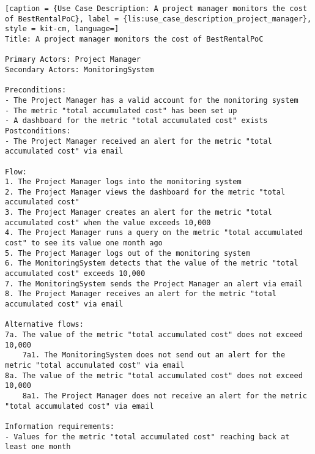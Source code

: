 \vspace{0.5cm}
\begin{lstlisting}[caption = {Use Case Description: A project manager monitors the cost of BestRentalPoC}, label = {lis:use_case_description_project_manager}, style = kit-cm, language=] 
Title: A project manager monitors the cost of BestRentalPoC

Primary Actors: Project Manager
Secondary Actors: MonitoringSystem

Preconditions:
- The Project Manager has a valid account for the monitoring system
- The metric "total accumulated cost" has been set up
- A dashboard for the metric "total accumulated cost" exists
Postconditions:
- The Project Manager received an alert for the metric "total accumulated cost" via email

Flow:
1. The Project Manager logs into the monitoring system
2. The Project Manager views the dashboard for the metric "total accumulated cost"
3. The Project Manager creates an alert for the metric "total accumulated cost" when the value exceeds 10,000
4. The Project Manager runs a query on the metric "total accumulated cost" to see its value one month ago
5. The Project Manager logs out of the monitoring system
6. The MonitoringSystem detects that the value of the metric "total accumulated cost" exceeds 10,000
7. The MonitoringSystem sends the Project Manager an alert via email
8. The Project Manager receives an alert for the metric "total accumulated cost" via email

Alternative flows:
7a. The value of the metric "total accumulated cost" does not exceed 10,000
	7a1. The MonitoringSystem does not send out an alert for the metric "total accumulated cost" via email
8a. The value of the metric "total accumulated cost" does not exceed 10,000
	8a1. The Project Manager does not receive an alert for the metric "total accumulated cost" via email

Information requirements:
- Values for the metric "total accumulated cost" reaching back at least one month
\end{lstlisting}

